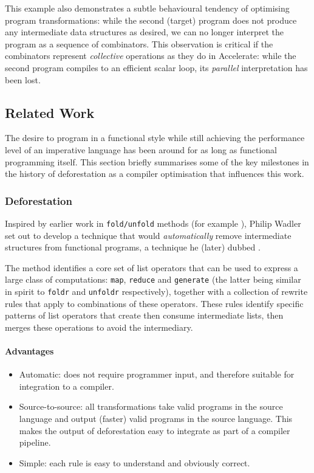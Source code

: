 This example also demonstrates a subtle behavioural tendency of optimising
program transformations: while the second (target) program does not produce any
intermediate data structures as desired, we can no longer interpret the program
as a sequence of combinators. This observation is critical if the combinators
represent \emph{collective} operations as they do in Accelerate: while the
second program compiles to an efficient scalar loop, its \emph{parallel}
interpretation has been lost.


\subsection{Related Work}

The desire to program in a functional style while still achieving the
performance level of an imperative language has been around for as long as
functional programming itself. This section briefly summarises some of the key
milestones in the history of deforestation as a compiler optimisation that
influences this work.

\subsubsection{Deforestation}

Inspired by earlier work in \texttt{fold/unfold} methods (for example
\citet{Burstall:1977kl}), Philip Wadler set out to develop a technique that
would \emph{automatically} remove intermediate structures from functional
programs, a technique he (later) dubbed 
\cite{Wadler:1981hy,Wadler:1990ix}.

The method identifies a core set of list operators that can be used to express a
large class of computations: \texttt{map}, \texttt{reduce} and
\texttt{generate} (the latter being similar in spirit to \texttt{foldr} and
\texttt{unfoldr} respectively), together with a collection of rewrite rules that
apply to combinations of these operators. These rules identify specific patterns
of list operators that create then consume intermediate lists, then merges these
operations to avoid the intermediary.

\paragraph{Advantages}
\begin{itemize}
    \item Automatic: does not require programmer input, and therefore suitable
        for integration to a compiler.

    \item Source-to-source: all transformations take valid programs in the
        source language and output (faster) valid programs in the source
        language. This makes the output of deforestation easy to integrate as
        part of a compiler pipeline.

    \item Simple: each rule is easy to understand and obviously correct.
\end{itemize}

